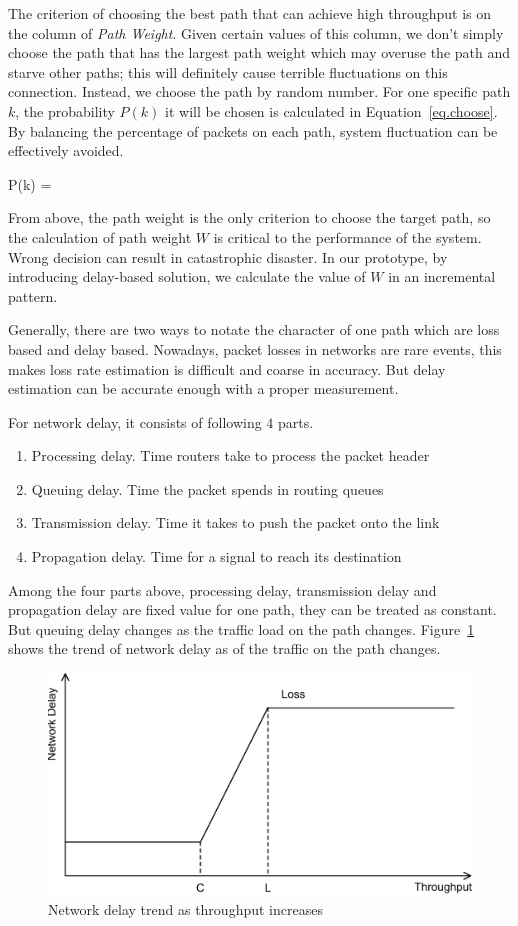 The criterion of choosing the best path that can achieve high throughput is on the column of \emph{Path Weight}. Given certain values of this column, we don't simply choose the path that has the largest path weight which may overuse the path and starve other paths; this will definitely cause terrible fluctuations on this connection. Instead, we choose the path by random number. For one specific path $k$, the probability $P(k)$ it will be chosen is calculated in Equation~\ref{eq.choose}. By balancing the percentage of packets on each path, system fluctuation can be effectively avoided.

\be
\label{eq.choose}
P(k) = 
\ee

From above, the path weight is the only criterion to choose the target path, so the calculation of path weight $W$ is critical to the performance of the system. Wrong decision can result in catastrophic disaster. In our prototype, by introducing delay-based solution, we calculate the value of $W$ in an incremental pattern.

Generally, there are two ways to notate the character of one path which are loss based and delay based. Nowadays, packet losses in networks are rare events, this makes loss rate estimation is difficult and coarse in accuracy. But delay estimation can be accurate enough with a proper measurement.

For network delay, it consists of following $4$ parts.

\begin{enumerate}
\item Processing delay. Time routers take to process the packet header
\item Queuing delay. Time the packet spends in routing queues
\item Transmission delay. Time it takes to push the packet onto the link
\item Propagation delay. Time for a signal to reach its destination
\end{enumerate}

Among the four parts above, processing delay, transmission delay and propagation delay are fixed value for one path, they can be treated as constant. But queuing delay changes as the traffic load on the path changes. Figure~\ref{fig.delay} shows the trend of network delay as of the traffic on the path changes.

\begin{figure}
\centering
\includegraphics[width=0.8\linewidth]{fig/delay.eps}
\caption{Network delay trend as throughput increases}
\label{fig.delay}
\end{figure}

